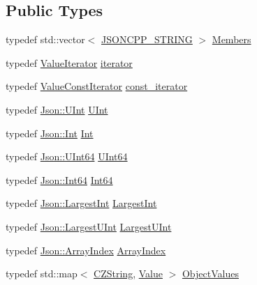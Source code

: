 \subsection*{Public Types}
\begin{DoxyCompactItemize}
\item 
typedef std\+::vector$<$ \hyperlink{json_8h_a1e723f95759de062585bc4a8fd3fa4be}{J\+S\+O\+N\+C\+P\+P\+\_\+\+S\+T\+R\+I\+NG} $>$ \hyperlink{class_json_1_1_value_a9ae9069983fc38f1928d76f9c79ac64d}{Members}
\item 
typedef \hyperlink{class_json_1_1_value_iterator}{Value\+Iterator} \hyperlink{class_json_1_1_value_a341cdf2e01f8b3c5b7317aa2f0768c53}{iterator}
\item 
typedef \hyperlink{class_json_1_1_value_const_iterator}{Value\+Const\+Iterator} \hyperlink{class_json_1_1_value_af92282ca92b58b320debd486afb7696a}{const\+\_\+iterator}
\item 
typedef \hyperlink{namespace_json_a800fb90eb6ee8d5d62b600c06f87f7d4}{Json\+::\+U\+Int} \hyperlink{class_json_1_1_value_a0933d59b45793ae4aade1757c322a98d}{U\+Int}
\item 
typedef \hyperlink{namespace_json_a08122e8005b706d982e48cca1e2119c7}{Json\+::\+Int} \hyperlink{class_json_1_1_value_abdf7a7ff73eb130ffcab28504ffdb405}{Int}
\item 
typedef \hyperlink{namespace_json_adf3fa5cb60c619e4f02315ad355e0ca1}{Json\+::\+U\+Int64} \hyperlink{class_json_1_1_value_a8b62564be8c087c6d18de180ff4e13e3}{U\+Int64}
\item 
typedef \hyperlink{namespace_json_ac62566f36fd33115957b91305c9ed1dc}{Json\+::\+Int64} \hyperlink{class_json_1_1_value_a1b86af9f85f0f1baa972c3319fa22695}{Int64}
\item 
typedef \hyperlink{namespace_json_a218d880af853ce786cd985e82571d297}{Json\+::\+Largest\+Int} \hyperlink{class_json_1_1_value_a1cbb82642ed05109b9833e49f042ece7}{Largest\+Int}
\item 
typedef \hyperlink{namespace_json_ae202ecad69725e23443f465e257456d0}{Json\+::\+Largest\+U\+Int} \hyperlink{class_json_1_1_value_a6682a3684d635e03fc06ba229fa24eec}{Largest\+U\+Int}
\item 
typedef \hyperlink{namespace_json_a8048e741f2177c3b5d9ede4a5b8c53c2}{Json\+::\+Array\+Index} \hyperlink{class_json_1_1_value_a184a91566cccca7b819240f0d5561c7d}{Array\+Index}
\item 
typedef std\+::map$<$ \hyperlink{class_json_1_1_value_1_1_c_z_string}{C\+Z\+String}, \hyperlink{class_json_1_1_value}{Value} $>$ \hyperlink{class_json_1_1_value_a08b6c80c3af7071d908dabf044de5388}{Object\+Values}
\end{DoxyCompactItemize}
